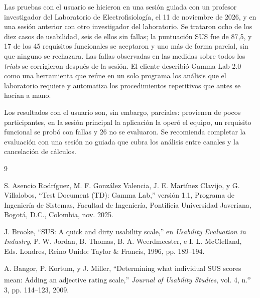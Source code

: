 \documentclass[12pt,letterpaper,oneside]{article}
\DeclareRobustCommand{\_}{\textunderscore\allowbreak}
\newcommand{\fechasesion}{11 de noviembre de 2026}
\begin{document}
Las pruebas con el usuario se hicieron en una sesión guiada con un profesor investigador del Laboratorio de Electrofisiología, el \fechasesion{}, y en una sesión anterior con otro investigador del laboratorio. Se trataron ocho de los diez casos de usabilidad, seis de ellos sin fallas; la puntuación SUS fue de 87,5, y 17 de los 45 requisitos funcionales se aceptaron y uno más de forma parcial, sin que ninguno se rechazara. Las fallas observadas en las medidas sobre todos los \textit{trials} se corrigieron después de la sesión. El cliente describió Gamma Lab 2.0 como una herramienta que reúne en un solo programa los análisis que el laboratorio requiere y automatiza los procedimientos repetitivos que antes se hacían a mano.

Los resultados con el usuario son, sin embargo, parciales: provienen de pocos participantes, en la sesión principal la aplicación la operó el equipo, un requisito funcional se probó con fallas y 26 no se evaluaron. Se recomienda completar la evaluación con una sesión no guiada que cubra los análisis entre canales y la cancelación de cálculos.

\begin{thebibliography}{9}

S. Asencio Rodríguez, M. F. González Valencia, J. E. Martínez Clavijo, y G. Villalobos, ``Test Document (TD): Gamma Lab,'' versión 1.1, Programa de Ingeniería de Sistemas, Facultad de Ingeniería, Pontificia Universidad Javeriana, Bogotá, D.C., Colombia, nov. 2025.

J. Brooke, ``SUS: A quick and dirty usability scale,'' en \textit{Usability Evaluation in Industry}, P. W. Jordan, B. Thomas, B. A. Weerdmeester, e I. L. McClelland, Eds. Londres, Reino Unido: Taylor \& Francis, 1996, pp. 189--194.

A. Bangor, P. Kortum, y J. Miller, ``Determining what individual SUS scores mean: Adding an adjective rating scale,'' \textit{Journal of Usability Studies}, vol. 4, n.\textsuperscript{o} 3, pp. 114--123, 2009.

\end{thebibliography}
\end{document}

